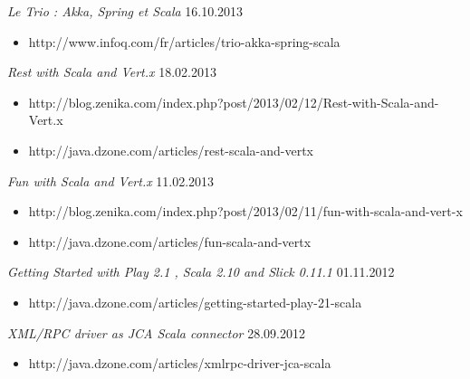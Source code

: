 \documentclass{res}
\begin{document}
\begin{resume}
{\sl Le Trio : Akka, Spring et Scala}  \hfill    16.10.2013	\\
\vspace{-5mm}  \begin{itemize}
 \item[]  \scriptsize http://www.infoq.com/fr/articles/trio-akka-spring-scala
\end{itemize}
\vspace{-2mm}

{\sl Rest with Scala and Vert.x}  \hfill    18.02.2013	\\
\vspace{-5mm}  \begin{itemize}
\item[]  \scriptsize http://blog.zenika.com/index.php?post/2013/02/12/Rest-with-Scala-and-Vert.x
\item[]  \scriptsize http://java.dzone.com/articles/rest-scala-and-vertx
\end{itemize}
\vspace{-2mm}

{\sl Fun with Scala and Vert.x}  \hfill    11.02.2013	\\
\vspace{-5mm}  \begin{itemize}
\item[]  \scriptsize http://blog.zenika.com/index.php?post/2013/02/11/fun-with-scala-and-vert-x
\item[]  \scriptsize http://java.dzone.com/articles/fun-scala-and-vertx
\end{itemize}
\vspace{-2mm}

{\sl Getting Started with Play 2.1 , Scala 2.10 and Slick 0.11.1}  \hfill    01.11.2012	\\
\vspace{-5mm}  \begin{itemize}
\item[]  \scriptsize http://java.dzone.com/articles/getting-started-play-21-scala
\end{itemize}
\vspace{-2mm}

{\sl XML/RPC driver as JCA Scala connector}  \hfill    28.09.2012	\\
\vspace{-5mm}  \begin{itemize}
\item[]  \scriptsize http://java.dzone.com/articles/xmlrpc-driver-jca-scala
\end{itemize}
\vspace{-2mm}


\end{resume}
\end{document}
